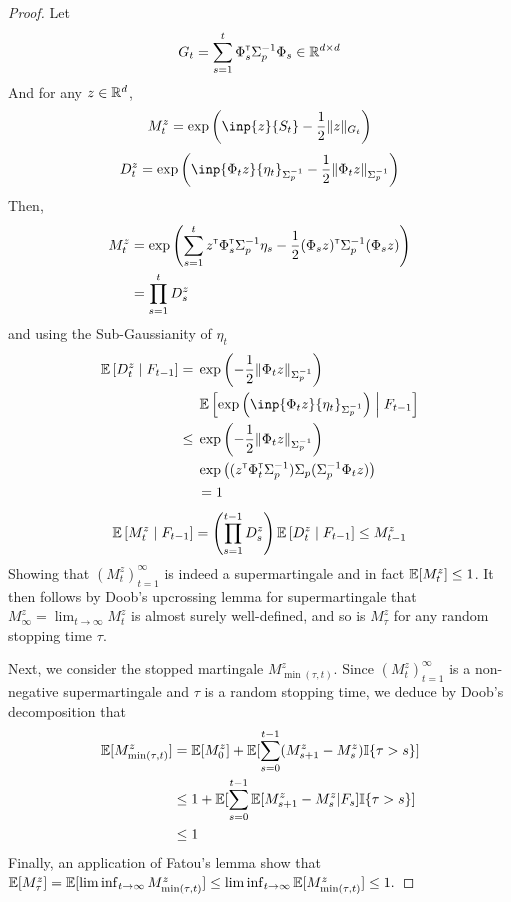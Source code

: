 \documentclass{article}
\begin{document}
\begin{proof}
Let 
\begin{equation*}
    G_t = \sum_{s=1}^t \Phi_s^{\mathsf{\scriptscriptstyle T}} \Sigma_p^{-1} \Phi_s \in \mathbb{R}^{d\times d}
\end{equation*}
And for any $z\in\mathbb{R}^d$,
\begin{equation*}
    M_t^z = \exp{\left(\inp{z}{S_t} - \frac{1}{2}\|z\|_{G_t}\right)}
\end{equation*}
\begin{equation*}
    D_t^z = \exp{\left(\inp{\Phi_t z}{\eta_t}_{\Sigma_p^{-1}} - \frac{1}{2}\|\Phi_t z\|_{\Sigma_p^{-1}}\right)}
\end{equation*}
Then,
\begin{align*}
    M_t^z &= \exp{\left(\sum_{s=1}^t z^{\mathsf{\scriptscriptstyle T}}\Phi_s^{\mathsf{\scriptscriptstyle T}}\Sigma_p^{-1} \eta_s - \frac{1}{2} (\Phi_s z)^{\mathsf{\scriptscriptstyle T}}\Sigma_p^{-1}(\Phi_s z) \right)} \\
    &= \prod_{s=1}^{t} D_s^z
\end{align*}
and using the Sub-Gaussianity of $\eta_t$
\begin{align*}
    \expectedvalue\left[D_t^z \condbar F_{t-1}\right] = {}& \exp{\left(- \frac{1}{2}\|\Phi_t z\|_{\Sigma_p^{-1}}\right)}\\ &\expectedvalue\left[\exp{\left(\inp{\Phi_t z}{\eta_t}_{\Sigma_p^{-1}}\right)} \condbar F_{t-1}\right]  \\
    \leq {} & \exp{\left(- \frac{1}{2}\|\Phi_t z\|_{\Sigma_p^{-1}}\right)}\\
    &\exp{\left((z^\transp \Phi_t^\transp \Sigma_p^{-1})\Sigma_p(\Sigma_p^{-1} \Phi_t z)\right)}\\
    &= 1
\end{align*}
\begin{align*}
    \operatorname*{\mathbb{E}}\left[M_t^z \;\middle|\; F_{t-1}\right] = \left(\prod_{s=1}^{t-1} D_s^z\right) \operatorname*{\mathbb{E}}\left[D_t^z \;\middle|\; F_{t-1}\right] \leq M_{t-1}^z
\end{align*}
Showing that $(M_t^z)_{t=1}^\infty$ is indeed a supermartingale and in fact $\operatorname*{\mathbb{E}}[M_t^z]\leq 1$.
It then follows by Doob's upcrossing lemma for supermartingale that $M_\infty^z = \lim_{t\to\infty} M_t^z$ is almost surely well-defined, and so is $M_\tau^z$ for any random stopping time $\tau$.

Next, we consider the stopped martingale $M_{\min(\tau,t)}^z$. Since 
$(M_t^z)_{t=1}^\infty$ is a non-negative supermartingale and $\tau$ is a random stopping time, we deduce by Doob's decomposition that
\begin{align*}
\operatorname*{\mathbb{E}}[M_{\min(\tau,t)}^z] &= \operatorname*{\mathbb{E}}[M_0^z] + \operatorname*{\mathbb{E}}[\sum_{s=0}^{t-1} (M_{s+1}^z-M_s^z) \mathbb{I}\{\tau>s\}]\\
&\leq 1 + \operatorname*{\mathbb{E}}[\sum_{s=0}^{t-1} \operatorname*{\mathbb{E}}[M_{s+1}^z-M_s^z|F_{s}] \mathbb{I}\{\tau>s\}]\\
&\leq 1
\end{align*}
Finally, an application of Fatou's lemma show that 
$\operatorname*{\mathbb{E}}[M_\tau^z] = \operatorname*{\mathbb{E}}[\liminf_{t\to\infty} M_{\min(\tau,t)}^z] \leq \liminf_{t\to\infty} \operatorname*{\mathbb{E}}[M_{\min(\tau,t)}^z] \leq 1.$


\end{proof}
\end{document}
